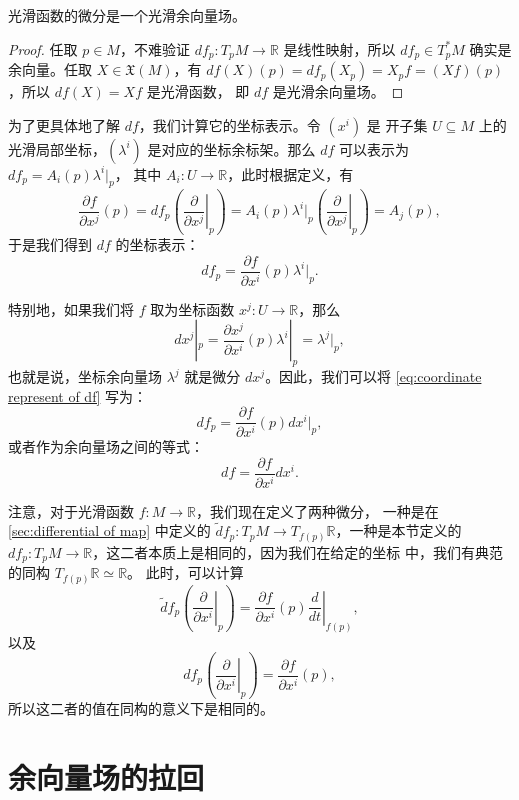 \documentclass[fontset=none]{Notes}
\begin{document}
\begin{proposition}
  光滑函数的微分是一个光滑余向量场。
\end{proposition}
\begin{proof}
  任取 $p\in M$，不难验证 $df_p:T_pM\to \mathbb{R}$ 是线性映射，所以
  $df_p\in T_p^*M$ 确实是余向量。任取 $X\in \mathfrak{X}(M)$，有
  $df(X)(p)=df_p(X_p)=X_pf=(Xf)(p)$，所以 $df(X)=Xf$ 是光滑函数，
  即 $df$ 是光滑余向量场。
\end{proof}

为了更具体地了解 $df$，我们计算它的坐标表示。令 $\left(x^i\right)$ 是
开子集 $U\subseteq M$ 上的光滑局部坐标，$\left(\lambda^i\right)$
是对应的坐标余标架。那么 $df$ 可以表示为 $df_p=A_i(p)\lambda^i|_p$，
其中 $A_i:U\to \mathbb{R}$，此时根据定义，有
\[
  \frac{\partial f}{\partial x^j}(p)=df_p\left(\left.\frac{\partial}{\partial x^j}\right|_p\right)
  =  A_i(p)\lambda^i|_p \left(\left.\frac{\partial}{\partial x^j}\right|_p\right)
  =A_j(p),
\]
于是我们得到 $df$ 的坐标表示：
\begin{equation}\label{eq:coordinate represent of df}
  df_p=\frac{\partial f}{\partial x^i}(p)\lambda^i|_p.
\end{equation}

特别地，如果我们将 $f$ 取为坐标函数 $x^j:U\to \mathbb{R}$，那么
\[
  dx^j|_p=  \frac{\partial x^j}{\partial x^i}(p)\lambda^i|_p
  =\lambda^j|_p,
\]
也就是说，坐标余向量场 $\lambda^j$ 就是微分 $dx^j$。因此，我们可以将
\eqref{eq:coordinate represent of df} 写为：
\[
  df_p=  \frac{\partial f}{\partial x^i}(p)dx^i|_p,
\]
或者作为余向量场之间的等式：
\begin{equation}
  df=\frac{\partial f}{\partial x^i}dx^i.
\end{equation}

注意，对于光滑函数 $f:M\to \mathbb{R}$，我们现在定义了两种微分，
一种是在 \ref{sec:differential of map} 中定义的
$\tilde{d}\!f_p:T_pM\to T_{f(p)}\mathbb{R}$，一种是本节定义的
$df_p:T_pM\to \mathbb{R}$，这二者本质上是相同的，因为我们在给定的坐标
中，我们有典范的同构 $T_{f(p)}\mathbb{R}\simeq \mathbb{R}$。
此时，可以计算
\[
  \tilde d\!f_p\left(\left.\frac{\partial}{\partial x^i}\right|_p\right)
  =\frac{\partial f}{\partial x^i}(p)\left.\frac{d}{dt}\right|_{f(p)},
\]
以及
\[
  df_p   \left(\left.\frac{\partial}{\partial x^i}\right|_p\right)
  =\frac{\partial f}{\partial x^i}(p),
\]
所以这二者的值在同构的意义下是相同的。

\section{余向量场的拉回}
\end{document}
